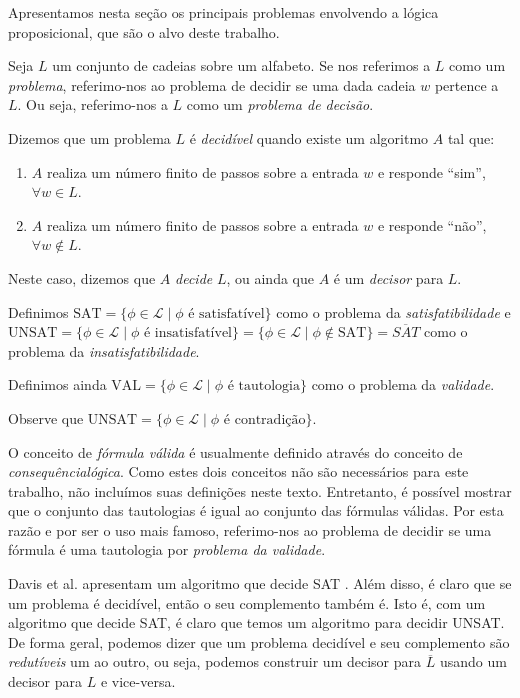 \indent

Apresentamos nesta seção os principais problemas envolvendo a lógica proposicional, que são o alvo deste trabalho.

\begin{definition}
	Seja $L$ um conjunto de cadeias sobre um alfabeto. Se nos referimos a $L$ como um \emph{problema}, referimo-nos ao problema de decidir se uma dada cadeia $w$ pertence a $L$. Ou seja, referimo-nos a $L$ como um \emph{problema de decisão}.
	
	Dizemos que um problema $L$ é \emph{decidível} quando existe um algoritmo $A$ tal que:
	\begin{enumerate}
		\item $A$ realiza um número finito de passos sobre a entrada $w$ e responde ``sim'', $\forall w \in L$.
		\item $A$ realiza um número finito de passos sobre a entrada $w$ e responde ``não'', $\forall w \notin L$.
	\end{enumerate}
	Neste caso, dizemos que $A$ \emph{decide} $L$, ou ainda que $A$ é um \emph{decisor} para $L$.
\end{definition}

\begin{definition}
	Definimos $\text{SAT} = \{\phi \in \mathcal{L} \mid \phi \text{ é satisfatível} \}$ como o problema da \emph{satisfatibilidade} e $\text{UNSAT} = \{\phi \in \mathcal{L} \mid \phi \text{ é insatisfatível} \} = \{\phi \in \mathcal{L} \mid \phi \notin \text{SAT} \} = \overline{SAT}$ como o problema da \emph{insatisfatibilidade}.
	
	Definimos ainda $\text{VAL} = \{\phi \in \mathcal{L} \mid \phi \text{ é tautologia} \}$ como o problema da \emph{validade}.
	
	Observe que $\text{UNSAT} = \{\phi \in \mathcal{L} \mid \phi \text{ é contradição} \}$.
\end{definition}

O conceito de \emph{fórmula válida} é usualmente definido através do conceito de \emph{consequência\break lógica}. Como estes dois conceitos não são necessários para este trabalho, não incluímos suas definições neste texto. Entretanto, é possível mostrar que o conjunto das tautologias é igual ao conjunto das fórmulas válidas. Por esta razão e por ser o uso mais famoso, referimo-nos ao problema de decidir se uma fórmula é uma tautologia por \emph{problema da validade}.

Davis et al. apresentam um algoritmo que decide SAT \cite{davis1960computing}. Além disso, é claro que se um problema é decidível, então o seu complemento também é. Isto é, com um algoritmo que decide SAT, é claro que temos um algoritmo para decidir UNSAT. De forma geral, podemos dizer que um problema decidível e seu complemento são \emph{redutíveis} um ao outro, ou seja, podemos construir um decisor para $\overline{L}$ usando um decisor para $L$ e vice-versa.

